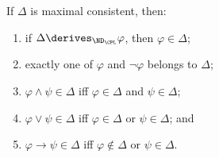 \begin{lemma}
\label{lem:prop-mcs}
If \(\Delta\) is maximal consistent, then:
\begin{enumerate}
  \item if \(\Delta\derives_{\ND_{\CPL}}\varphi\), then
        \(\varphi\in\Delta\);
  \item exactly one of \(\varphi\) and \(\neg\varphi\) belongs to
        \(\Delta\);
  \item \(\varphi\land\psi\in\Delta\) iff
        \(\varphi\in\Delta\) and \(\psi\in\Delta\);
  \item \(\varphi\lor\psi\in\Delta\) iff
        \(\varphi\in\Delta\) or \(\psi\in\Delta\); and
  \item \(\varphi\to\psi\in\Delta\) iff
        \(\varphi\notin\Delta\) or \(\psi\in\Delta\).
\end{enumerate}
\end{lemma}
